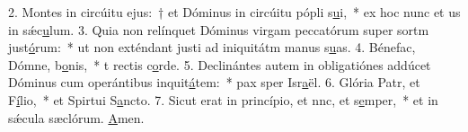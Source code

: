2. Montes in circúitu ejus:~† et Dóminus in circúitu pópli s\uline{u}i,~* ex hoc nunc et us in sǽc\uline{u}lum.
3. Quia non relínquet Dóminus virgam peccatórum super sortm just\uline{ó}rum:~* ut non exténdant justi ad iniquitátm manus s\uline{u}as.
4. Bénefac, Dómne, b\uline{o}nis,~* t rectis c\uline{o}rde.
5. Declinántes autem in obligatiónes addúcet Dóminus cum operántibus inquit\uline{á}tem:~* pax sper Isr\uline{a}ël.
6. Glória Patr, et F\uline{í}lio,~* et Spirtui S\uline{a}ncto.
7. Sicut erat in princípio, et nnc, et s\uline{e}mper,~* et in sǽcula sæclórum. \uline{A}men.
